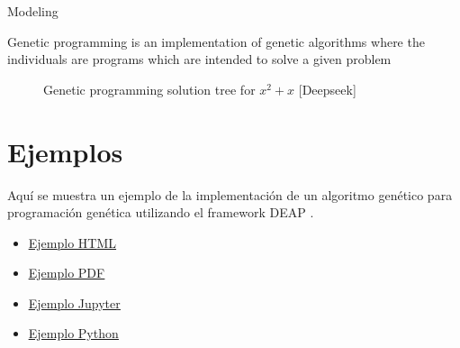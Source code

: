 \begin{frame}[allowframebreaks]{Modeling}

    \begin{blur}
      Genetic programming is an implementation of genetic algorithms where
      the individuals are programs which are intended to solve a given
      problem

      \begin{figure} [!ht]
        \begin{center}
        \end{center}
        \caption{Genetic programming solution tree for $x^2 + x$ [Deepseek]}
      \end{figure}
    \end{blur}


    \section{Ejemplos}
    \begin{blur}

      Aquí se muestra un ejemplo de la implementación de un algoritmo genético para
      programación genética utilizando el framework DEAP \cite{DEAPGENETIC}.

      \begin{itemize}
        \item \href{run:./Ejemplo/DEAP-GP.html} {\underline{Ejemplo HTML}}
        \item \href{run:./Ejemplo/DEAP-GP.pdf}   {\underline{Ejemplo PDF}}
        \item \href{run:./Ejemplo/DEAP-GP.ipynb}{\underline{Ejemplo Jupyter}}
        \item \href{run:./Ejemplo/DEAP_GP.py}   {\underline{Ejemplo Python}}
    \end{itemize}

    \end{blur}

\end{frame}
